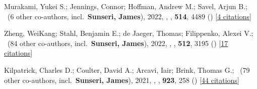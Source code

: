 \item Murakami, Yukei S.; Jennings, Connor; Hoffman, Andrew M.; Savel, Arjun B.; \etal\ ({6} other co-authors, incl.\ \textbf{Sunseri, James}), 2022, , \mnras, \textbf{514}, 4489 () [\href{https://ui.adsabs.harvard.edu/abs/2022MNRAS.514.4489M}{4 citations}]

\item Zheng, WeiKang; Stahl, Benjamin E.; de Jaeger, Thomas; Filippenko, Alexei V.; \etal\ ({84} other co-authors, incl.\ \textbf{Sunseri, James}), 2022, , \mnras, \textbf{512}, 3195 () [\href{https://ui.adsabs.harvard.edu/abs/2022MNRAS.512.3195Z}{17 citations}]

\item Kilpatrick, Charles D.; Coulter, David A.; Arcavi, Iair; Brink, Thomas G.; \etal\ ({79} other co-authors, incl.\ \textbf{Sunseri, James}), 2021, , \apj, \textbf{923}, 258 () [\href{https://ui.adsabs.harvard.edu/abs/2021ApJ...923..258K}{44 citations}]